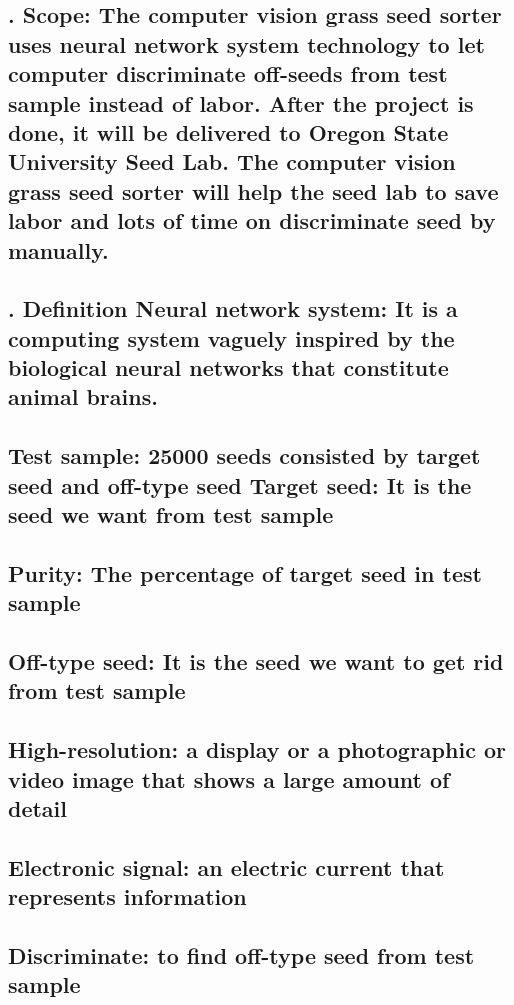 \documentclass[10pt, letterpaper, twoside, draftclsnofoot, onecolumn. notitlepage]{article}
\begin{document}
\subsection{. Scope:
The computer vision grass seed sorter uses neural network system technology to let computer discriminate off-seeds from test sample instead of labor. After the project is done, it will be delivered to Oregon State University Seed Lab. The computer vision grass seed sorter will help the seed lab to save labor and lots of time on discriminate seed by manually.} 
\subsection{
. Definition
Neural network system: It is a computing system vaguely inspired by the biological neural networks that constitute animal brains.}
\subsection{
Test sample: 25000 seeds consisted by target seed and off-type seed
Target seed: It is the seed we want from test sample}
\subsection{
Purity: The percentage of target seed in test sample}
\subsection{
Off-type seed: It is the seed we want to get rid from test sample}
\subsection{
High-resolution: a display or a photographic or video image that shows a large amount of detail}
\subsection{
Electronic signal: an electric current that represents information}
\subsection{
Discriminate: to find off-type seed from test sample}
\end{document}

